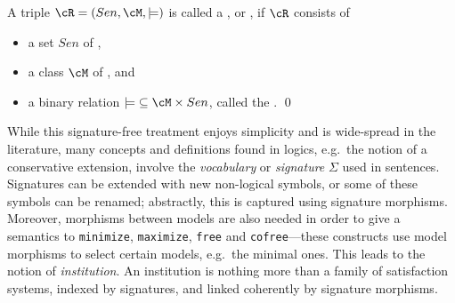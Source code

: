 \documentclass[10pt,fleqn,final]{scrreprt}
\newcommand*{\syntax}[1]{\texttt{#1}}
\providecommand{\DIFadd}[1]{{\protect\color{blue}\uwave{#1}}} %
\providecommand{\DIFdel}[1]{{\protect\color{red}\sout{#1}}}                      %
\providecommand{\DIFaddbegin}{} %
\providecommand{\DIFaddend}{} %
\providecommand{\DIFdelbegin}{} %
\providecommand{\DIFdelend}{} %
\begin{document}
\begin{definition}\label{def:room}
A triple \DIFdelbegin \DIFdel{$\cR=(Sen,{\cM,\models)}$  }\DIFdelend \DIFaddbegin \DIFadd{$\cR=(\mathit{Sen},{\cM,\models)}$  }\DIFaddend is called a , or , if $\cR$ consists of
\begin{itemize}
\item a set \DIFdelbegin \DIFdel{$Sen$ }\DIFdelend \DIFaddbegin \DIFadd{$\mathit{Sen}$ }\DIFaddend of ,
\item a class
$\cM$ of , and
\item a binary relation
\DIFdelbegin \DIFdel{${\models}\subseteq \cM \times Sen$}\DIFdelend \DIFaddbegin \DIFadd{${\models} \subseteq \cM \times \mathit{Sen}$}\DIFaddend , called the .\DIFdelbegin %
\DIFdelend \DIFaddbegin \quad\DIFaddend \qed
\DIFaddbegin \end{itemize}
\DIFaddend \end{definition}


While this signature-free treatment enjoys simplicity and is wide-spread in the literature, many 
concepts and definitions found in logics, e.g.\ the notion of a conservative extension, involve the
\emph{vocabulary} or \emph{signature} $\Sigma$ \label{vocabulary} used in sentences.  Signatures 
can be extended with new non-logical symbols, or some of these symbols can be renamed; abstractly, 
this is captured using signature morphisms. Moreover,  morphisms
between models are also needed in order to give a semantics to \syntax{minimize},
\syntax{maximize}, \syntax{free} and \syntax{cofree}---these constructs
use model morphisms to select certain models, e.g.\ the minimal ones.
This leads to the notion of \emph{institution}. An institution
is nothing more than a family of satisfaction systems, indexed by
signatures, and linked coherently by signature morphisms.
\end{document}
